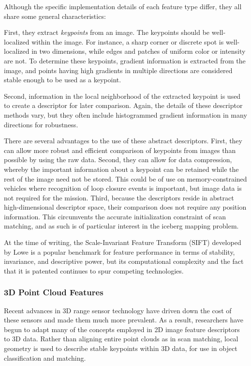Although the specific implementation details of each feature type differ, they all share some general characteristics:

First, they extract \emph{keypoints} from an image. The keypoints should be well-localized within the image. For instance, a sharp corner or discrete spot is well-localized in two dimensions, while edges and patches of uniform color or intensity are not. To determine these keypoints, gradient information is extracted from the image, and points having high gradients in multiple directions are considered stable enough to be used as a keypoint. 

Second, information in the local neighborhood of the extracted keypoint is used to create a descriptor for later comparison. Again, the details of these descriptor methods vary, but they often include histogrammed gradient information in many directions for robustness. 

There are several advantages to the use of these abstract descriptors. First, they can allow more robust and efficient comparison of keypoints from images than possible by using the raw data. Second, they can allow for data compression, whereby the important information about a keypoint can be retained while the rest of the image need not be stored. This could be of use on memory-constrained vehicles where recognition of loop closure events is important, but image data is not required for the mission. Third, because the descriptors reside in abstract high-dimensional descriptor space, their comparison does not require any position information. This circumvents the accurate initialization constraint of scan matching, and as such is of particular interest in the iceberg mapping problem.

At the time of writing, the Scale-Invariant Feature Transform (SIFT) developed by Lowe \cite{Lowe2004} is a popular benchmark for feature performance in terms of stability, invariance, and descriptive power, but its computational complexity and the fact that it is patented continues to spur competing technologies.

\subsubsection{3D Point Cloud Features}

Recent advances in 3D range sensor technology have driven down the cost of these sensors and made them much more prevalent. As a result, researchers have begun to adapt many of the concepts employed in 2D image feature descriptors to 3D data. Rather than aligning entire point clouds as in scan matching, local geometry is used to describe stable keypoints within 3D data, for use in object classification and matching. 

